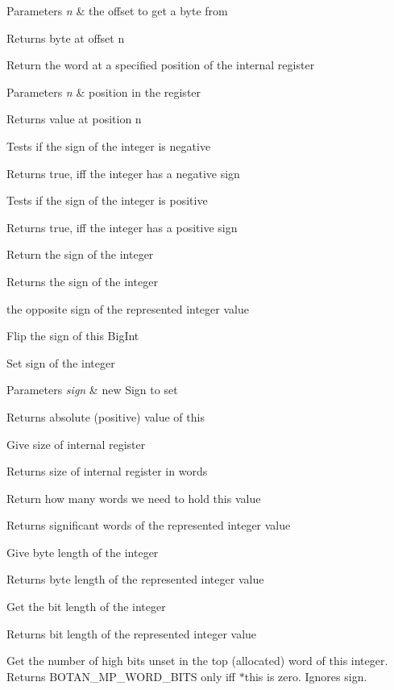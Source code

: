 \begin{DoxyParams}{Parameters}
{\em n} & the offset to get a byte from \\
\hline
\end{DoxyParams}
\begin{DoxyReturn}{Returns}
byte at offset n
\end{DoxyReturn}
Return the word at a specified position of the internal register 
\begin{DoxyParams}{Parameters}
{\em n} & position in the register \\
\hline
\end{DoxyParams}
\begin{DoxyReturn}{Returns}
value at position n
\end{DoxyReturn}
Tests if the sign of the integer is negative \begin{DoxyReturn}{Returns}
true, iff the integer has a negative sign
\end{DoxyReturn}
Tests if the sign of the integer is positive \begin{DoxyReturn}{Returns}
true, iff the integer has a positive sign
\end{DoxyReturn}
Return the sign of the integer \begin{DoxyReturn}{Returns}
the sign of the integer

the opposite sign of the represented integer value
\end{DoxyReturn}
Flip the sign of this Big\+Int

Set sign of the integer 
\begin{DoxyParams}{Parameters}
{\em sign} & new Sign to set\\
\hline
\end{DoxyParams}
\begin{DoxyReturn}{Returns}
absolute (positive) value of this
\end{DoxyReturn}
Give size of internal register \begin{DoxyReturn}{Returns}
size of internal register in words
\end{DoxyReturn}
Return how many words we need to hold this value \begin{DoxyReturn}{Returns}
significant words of the represented integer value
\end{DoxyReturn}
Give byte length of the integer \begin{DoxyReturn}{Returns}
byte length of the represented integer value
\end{DoxyReturn}
Get the bit length of the integer \begin{DoxyReturn}{Returns}
bit length of the represented integer value
\end{DoxyReturn}
Get the number of high bits unset in the top (allocated) word of this integer. Returns B\+O\+T\+A\+N\+\_\+\+M\+P\+\_\+\+W\+O\+R\+D\+\_\+\+B\+I\+TS only iff $\ast$this is zero. Ignores sign.

